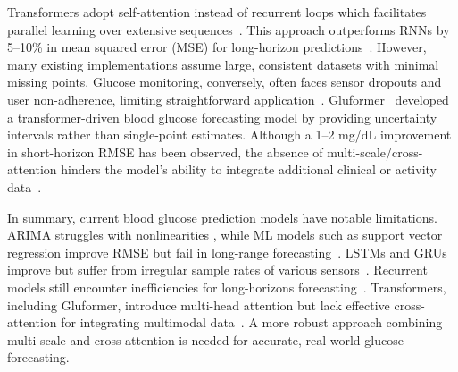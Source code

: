 Transformers adopt self-attention instead of recurrent loops which facilitates parallel learning over extensive sequences~\cite{vaswani2017attention}. This approach outperforms RNNs by 5--10\% in mean squared error (MSE) for long-horizon predictions~\cite{kim2024comprehensive, farahmand2024hybrid}. However, many existing implementations assume large, consistent datasets with minimal missing points. Glucose monitoring, conversely, often faces sensor dropouts and user non-adherence, limiting straightforward application~\cite{acuna2023analyzing}. Gluformer~\cite{sergazinov2023gluformer} developed a transformer-driven blood glucose forecasting model by providing uncertainty intervals rather than single-point estimates. Although a 1--2 mg/dL improvement in short-horizon RMSE has been observed, the absence of multi-scale/cross-attention hinders the model’s ability to integrate additional clinical or activity data~\cite{sergazinov2023gluformer}.

% 

In summary, current blood glucose prediction models have notable limitations. ARIMA struggles with nonlinearities \cite{xie2020benchmarking, mujahid2021machine}, while ML models such as support vector regression improve RMSE but fail in long-range forecasting~\cite{xie2020benchmarking, mujahid2021machine}. LSTMs and GRUs improve but suffer from irregular sample rates of various sensors~\cite{kong2024unlocking, shuvo2023deep}. Recurrent models still encounter inefficiencies for long-horizons forecasting~\cite{kong2024unlocking}. Transformers, including Gluformer, introduce multi-head attention but lack effective cross-attention for integrating multimodal data~\cite{zhu2023edge, acuna2023analyzing}. A more robust approach combining multi-scale and cross-attention is needed for accurate, real-world glucose forecasting.







